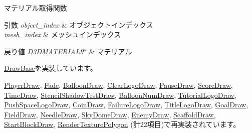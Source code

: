 マテリアル取得関数 


\begin{DoxyParams}{引数}
{\em object\+\_\+index} & オブジェクトインデックス \\
\hline
{\em mesh\+\_\+index} & メッシュインデックス \\
\hline
\end{DoxyParams}

\begin{DoxyRetVals}{戻り値}
{\em D3\+D\+M\+A\+T\+E\+R\+I\+A\+L9$\ast$} & マテリアル \\
\hline
\end{DoxyRetVals}


\mbox{\hyperlink{class_draw_base_a940543b482e934624637f3c6b4d17f96}{Draw\+Base}}を実装しています。



\mbox{\hyperlink{class_player_draw_acb94ea7611a99698507321e44b7e9acb}{Player\+Draw}}, \mbox{\hyperlink{class_fade_adbd049cfdaf165670d1b97b03151a5cd}{Fade}}, \mbox{\hyperlink{class_balloon_draw_aa84c8479ee1a6e95376b7fc0c82e5173}{Balloon\+Draw}}, \mbox{\hyperlink{class_clear_logo_draw_a6273330249f20ddcde3a2ab97c1bdca2}{Clear\+Logo\+Draw}}, \mbox{\hyperlink{class_pause_draw_afa2566700e81ce898e874ce71a8943d5}{Pause\+Draw}}, \mbox{\hyperlink{class_score_draw_a89a4917ed27a9d89cfa3e3acfaecacc2}{Score\+Draw}}, \mbox{\hyperlink{class_time_draw_a32e9166df2da094b6b8c6cfc9dd73872}{Time\+Draw}}, \mbox{\hyperlink{class_stencil_shadow_test_draw_aacdc680646f832451ea575f1da1eec9a}{Stencil\+Shadow\+Test\+Draw}}, \mbox{\hyperlink{class_balloon_num_draw_aa517d5cd0ff871f61145d916f6056922}{Balloon\+Num\+Draw}}, \mbox{\hyperlink{class_tutorial_logo_draw_acbd9aefdbd4450188e561fb5e5dcd64f}{Tutorial\+Logo\+Draw}}, \mbox{\hyperlink{class_push_space_logo_draw_a4dc41e6b1afece431f3c321145abe541}{Push\+Space\+Logo\+Draw}}, \mbox{\hyperlink{class_coin_draw_ad62dd6a9dd468342849a0c6ad5f8a5dd}{Coin\+Draw}}, \mbox{\hyperlink{class_failure_logo_draw_a60b0cd983365acdad363cdaf8ebdef46}{Failure\+Logo\+Draw}}, \mbox{\hyperlink{class_title_logo_draw_aafb35175c0ffe60c7a3facf7f9cda2f2}{Title\+Logo\+Draw}}, \mbox{\hyperlink{class_goal_draw_ae7f45a84006809475aba8d9ce1b1f8a5}{Goal\+Draw}}, \mbox{\hyperlink{class_field_draw_a5ed29c14e0013513d72f79f8651db805}{Field\+Draw}}, \mbox{\hyperlink{class_needle_draw_aff38ea3f7201eb584e81ae9d6b9328cf}{Needle\+Draw}}, \mbox{\hyperlink{class_sky_dome_draw_a45d3e8d70753af83c84c7a7c9193459f}{Sky\+Dome\+Draw}}, \mbox{\hyperlink{class_enemy_draw_a3f2885da84533364daaaac4a801fbc46}{Enemy\+Draw}}, \mbox{\hyperlink{class_scaffold_draw_a22d8838f68a92b3307008ba952ad718d}{Scaffold\+Draw}}, \mbox{\hyperlink{class_start_block_draw_a42d2c4f04609ba09359470fc38113bbf}{Start\+Block\+Draw}}, \mbox{\hyperlink{class_render_texture_polygon_a86dac06a0a8c8cc64ade472011745fa3}{Render\+Texture\+Polygon}} (計22項目)で再実装されています。



